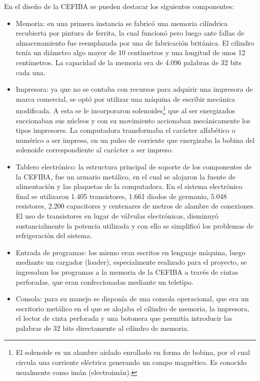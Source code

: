 \documentclass[%
  	final,
%
	notitlepage,
	narroweqnarray,
	inline,
 	twoside,
	]{ieee}
\begin{document}
\textbf{}

En el dise\~no de la CEFIBA se pueden destacar los siguientes componentes:\\

\begin{itemize}
\item Memoria: en una primera instancia se fabric\'o una memoria cil\'indrica recubierta por pintura de ferrita, la cual funcion\'o pero luego ante fallas de almacenamiento fue reemplazada por una de fabricaci\'on brit\'anica. El cilindro ten\'ia un di\'ametro algo mayor de 10 cent\'imetros y una longitud de unos 12 cent\'imetros. La capacidad de la memoria era de 4.096 palabras de 32 bits cada una.\\

\item Impresora: ya que no se contaba con recursos para adquirir una impresora de marca comercial, se opt\'o por utilizar una m\'aquina de escribir mec\'anica modificada. A esta se le incorporaron solenoides\footnote{El solenoide es un alambre aislado enrollado en forma de bobina, por el cual circula una corriente el\'ectrica generando un campo magn\'etico. Es conocido usualmente como im\'an (electroim\'an).} que al ser energizados succionaban sus n\'ucleos y con su movimiento accionaban mec\'anicamente los tipos impresores. La computadora transformaba el car\'acter alfab\'etico o num\'erico a ser impreso, en un pulso de corriente que energizaba la bobina del solenoide correspondiente al car\'acter a ser impreso.\\

\item Tablero electr\'onico: la estructura principal de soporte de los componentes de la CEFIBA, fue un armario met\'alico, en el cual se alojaron la fuente de alimentaci\'on y las plaquetas de la computadora. En el sistema electr\'onico final se utilizaron 1.405 transistores, 1.661 diodos de germanio, 5.048 resistores, 2.200 capacitores y centenares de metros de alambre de conexiones. El uso de transistores en lugar de v\'alvulas electr\'onicas, disminuy\'o sustancialmente la potencia utilizada y con ello se simplific\'o los problemas de refrigeraci\'on del sistema.\\

\item Entrada de programas: los mismo eran escritos en lenguaje m\'aquina, luego mediante un cargador (loader), especialmente realizado para el proyecto, se ingresaban los programas a la memoria de la CEFIBA a trav\'es de cintas perforadas, que eran confeccionadas mediante un teletipo.\\

\item Consola: para su manejo se dispon\'ia de una consola operacional, que era un escritorio met\'alico en el que se alojaba el cilindro de memoria, la impresora, el lector de cinta perforada y una botonera que permit\'ia introducir las palabras de 32 bits directamente al cilindro de memoria.\\
\end{itemize}
\end{document}
